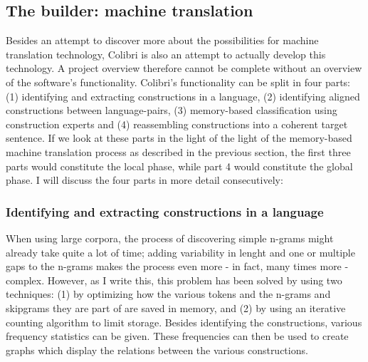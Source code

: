 \documentclass[12pt]{article}
\begin{document}

\subsection{The builder: machine translation}
Besides an attempt to discover more about the possibilities for machine translation technology, Colibri is also an attempt to actually develop this technology. A project overview therefore cannot be complete without an overview of the software's functionality. Colibri's functionality can be split in four parts: (1) identifying and extracting constructions in a language, (2) identifying aligned constructions between language-pairs, (3) memory-based classification using construction experts and (4) reassembling constructions into a coherent target sentence. If we look at these parts in the light of the light of the memory-based machine translation process as described in the previous section, the first three parts would constitute the local phase, while part 4 would constitute the global phase. I will discuss the four parts in more detail consecutively:

\subsubsection{Identifying and extracting constructions in a language}
When using large corpora, the process of discovering simple n-grams might already take quite a lot of time; adding variability in lenght and one or multiple gaps to the n-grams makes the process even more - in fact, many times more - complex. However, as I write this, this problem has been solved by using two techniques: (1) by optimizing how the various tokens and the n-grams and skipgrams they are part of are saved in memory, and (2) by using an iterative counting algorithm to limit storage. Besides identifying the constructions, various frequency statistics can be given. These frequencies can then be used to create graphs which display the relations between the various constructions.

\end{document}
